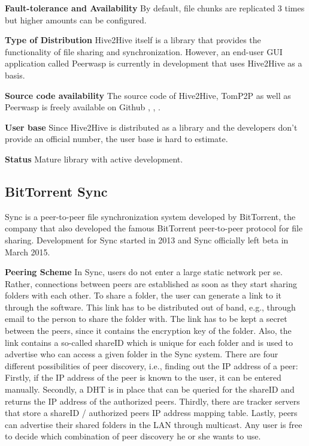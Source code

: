 \textbf{Fault-tolerance and Availability}
By default, file chunks are replicated 3 times but higher amounts can be configured.

\textbf{Type of Distribution}
Hive2Hive itself is a library that provides the functionality of file sharing and synchronization. However, an end-user GUI application called Peerwasp \cite{peerwasp} is currently in development that uses Hive2Hive as a basis.

\textbf{Source code availability}
The source code of Hive2Hive, TomP2P as well as Peerwasp is freely available on Github \cite{hive2hive:github}, \cite{tomp2p:github}, \cite{peerwasp:github}. 

\textbf{User base}
Since Hive2Hive is distributed as a library and the developers don't provide an official number, the user base is hard to estimate.

\textbf{Status}
Mature library with active development.

\subsection{BitTorrent Sync} %
Sync is a peer-to-peer file synchronization system developed by BitTorrent, the company that also developed the famous BitTorrent peer-to-peer protocol for file sharing. Development for Sync started in 2013 and Sync officially left beta in March 2015.

\textbf{Peering Scheme}
In Sync, users do not enter a large static network per se. Rather, connections between peers are established as soon as they start sharing folders with each other. To share a folder, the user can generate a link to it through the software. This link has to be distributed out of band, e.g., through email to the person to share the folder with. The link has to be kept a secret between the peers, since it contains the encryption key of the folder. Also, the link contains a so-called shareID which is unique for each folder and is used to advertise who can access a given folder in the Sync system. There are four different possibilities of peer discovery, i.e., finding out the IP address of a peer: Firstly, if the IP address of the peer is known to the user, it can be entered manually. Secondly, a DHT is in place that can be queried for the shareID and returns the IP address of the authorized peers. Thirdly, there are tracker servers that store a shareID / authorized peers IP address mapping table. Lastly, peers can advertise their shared folders in the LAN through multicast. Any user is free to decide which combination of peer discovery he or she wants to use.

